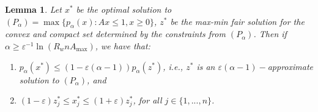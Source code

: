 \documentclass[11pt]{article}
\newcommand{\wratio}{R_w}
\newtheorem{lemma}[theorem]{Lemma}
\newif\iffullpaper
\begin{document}
\begin{lemma}\label{lemma:mmf-alpha-fair}
Let $x^*$ be the optimal solution to $(P_\alpha) = \max\{p_\alpha(x): Ax\leq 1, x\geq 0\}$, $z^*$ be the max-min fair solution for the convex and compact set determined by the constraints from $(P_\alpha)$. Then if $\alpha \geq {\varepsilon}^{-1} \ln\left(\wratio n A_{\max}\right)$, we have that:
\begin{enumerate}
\item $p_\alpha(x^*) \leq (1-{\varepsilon}(\alpha - 1))p_\alpha(z^*)$, i.e., $z^*$ is an ${\varepsilon}(\alpha-1)-$approximate solution to $(P_\alpha)$, and
\item $(1-\varepsilon)z_j^* \leq x_j^* \leq (1+\varepsilon)z_j^*$, for all $j \in \{1,...,n\}$.
\end{enumerate}
\end{lemma}
\iffullpaper
\end{document}
